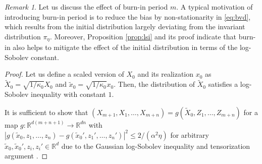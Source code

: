 \documentclass[12pt,reqno]{amsart}
\theoremstyle{remark}
\newtheorem{remark}{Remark}
\theoremstyle{definition}
\newcommand{\R}{\mathbb{R}}
\newcommand{\tx}{\tilde{x}}
\newcommand{\tX}{\tilde{X}}
\begin{document}
\begin{remark}
    Let us discuss the effect of burn-in period $m$.
    A typical motivation of introducing burn-in period is to reduce the bias by non-stationarity in \eqref{eq:bvd}, which results from the initial distribution largely deviating from the invariant distribution $\pi_{\eta}$.
    Moreover, Proposition \ref{prop:lsi} and its proof indicate that burn-in also helps to mitigate the effect of the initial distribution in terms of the log-Sobolev constant.
\end{remark}


\begin{proof}
Let us define a scaled version of $X_{0}$ and its realization $x_{0}$ as $\tX_{0}=\sqrt{1/\kappa_{0}}X_{0}$ and $\tx_{0}=\sqrt{1/\kappa_{0}}x_{0}$.
Then, the distribution of $\tX_{0}$ satisfies a log-Sobolev inequality with constant $1$.

It is sufficient to show that $(X_{m+1},X_{1},\ldots,X_{m+n})=g(\tX_{0},Z_{1},\ldots,Z_{m+n})$ for a map $g:\R^{d(m+n+1)}\to\R^{dn}$ with $|g(\tx_{0},z_{1},\ldots,z_{n})-g(\tx_{0}',z_{1}',\ldots,z_{n}')|^{2}\le 2/(\alpha^{2}\eta)$ for arbitrary $\tx_{0},\tx_{0}',z_{i},z_{i}'\in\R^{d}$ due to the Gaussian log-Sobolev inequality and tensorization argument \citep{bakry2014analysis}.


\end{proof}
\end{document}
